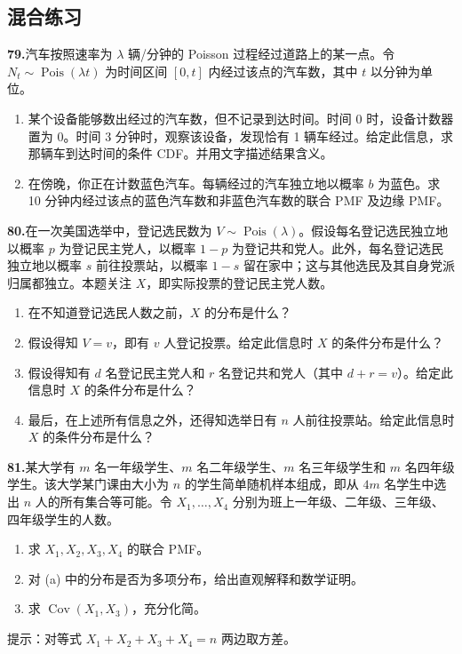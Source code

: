\documentclass[UTF8,12pt,a4paper,fontset=fandol]{ctexart}
\begin{document}
\subsection*{混合练习}

\noindent\textbf{79.}\quad 汽车按照速率为 $\lambda$ 辆/分钟的 Poisson 过程经过道路上的某一点。令 $N_t\sim \operatorname{Pois}(\lambda t)$ 为时间区间 $[0,t]$ 内经过该点的汽车数，其中 $t$ 以分钟为单位。
\begin{enumerate}
  \item[(a)] 某个设备能够数出经过的汽车数，但不记录到达时间。时间 $0$ 时，设备计数器置为 $0$。时间 3 分钟时，观察该设备，发现恰有 1 辆车经过。给定此信息，求那辆车到达时间的条件 CDF。并用文字描述结果含义。
  \item[(b)] 在傍晚，你正在计数蓝色汽车。每辆经过的汽车独立地以概率 $b$ 为蓝色。求 10 分钟内经过该点的蓝色汽车数和非蓝色汽车数的联合 PMF 及边缘 PMF。
\end{enumerate}

\noindent\textbf{80.}\quad 在一次美国选举中，登记选民数为 $V\sim \operatorname{Pois}(\lambda)$。假设每名登记选民独立地以概率 $p$ 为登记民主党人，以概率 $1-p$ 为登记共和党人。此外，每名登记选民独立地以概率 $s$ 前往投票站，以概率 $1-s$ 留在家中；这与其他选民及其自身党派归属都独立。本题关注 $X$，即实际投票的登记民主党人数。
\begin{enumerate}
  \item[(a)] 在不知道登记选民人数之前，$X$ 的分布是什么？
  \item[(b)] 假设得知 $V=v$，即有 $v$ 人登记投票。给定此信息时 $X$ 的条件分布是什么？
  \item[(c)] 假设得知有 $d$ 名登记民主党人和 $r$ 名登记共和党人（其中 $d+r=v$）。给定此信息时 $X$ 的条件分布是什么？
  \item[(d)] 最后，在上述所有信息之外，还得知选举日有 $n$ 人前往投票站。给定此信息时 $X$ 的条件分布是什么？
\end{enumerate}

\noindent\textbf{81.}\quad 某大学有 $m$ 名一年级学生、$m$ 名二年级学生、$m$ 名三年级学生和 $m$ 名四年级学生。该大学某门课由大小为 $n$ 的学生简单随机样本组成，即从 $4m$ 名学生中选出 $n$ 人的所有集合等可能。令 $X_1,\ldots,X_4$ 分别为班上一年级、二年级、三年级、四年级学生的人数。
\begin{enumerate}
  \item[(a)] 求 $X_1,X_2,X_3,X_4$ 的联合 PMF。
  \item[(b)] 对 (a) 中的分布是否为多项分布，给出直观解释和数学证明。
  \item[(c)] 求 $\operatorname{Cov}(X_1,X_3)$，充分化简。
\end{enumerate}
提示：对等式 $X_1+X_2+X_3+X_4=n$ 两边取方差。
\end{document}
